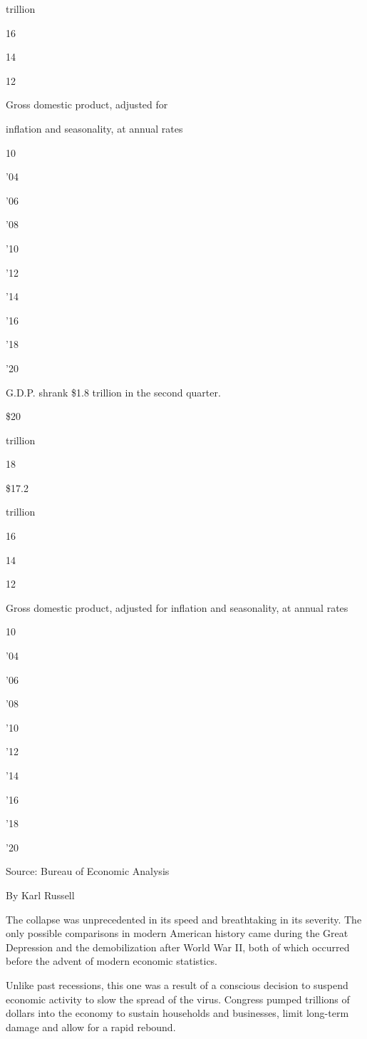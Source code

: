 trillion

16

14

12

Gross domestic product, adjusted for

inflation and seasonality, at annual rates

10

'04

'06

'08

'10

'12

'14

'16

'18

'20

G.D.P. shrank \$1.8 trillion in the second quarter.

\$20

trillion

18

\$17.2

trillion

16

14

12

Gross domestic product, adjusted for inflation and seasonality, at
annual rates

10

'04

'06

'08

'10

'12

'14

'16

'18

'20

Source: Bureau of Economic Analysis

By Karl Russell

The collapse was unprecedented in its speed and breathtaking in its
severity. The only possible comparisons in modern American history came
during the Great Depression and the demobilization after World War II,
both of which occurred before the advent of modern economic statistics.

Unlike past recessions, this one was a result of a conscious decision to
suspend economic activity to slow the spread of the virus. Congress
pumped trillions of dollars into the economy to sustain households and
businesses, limit long-term damage and allow for a rapid rebound.

